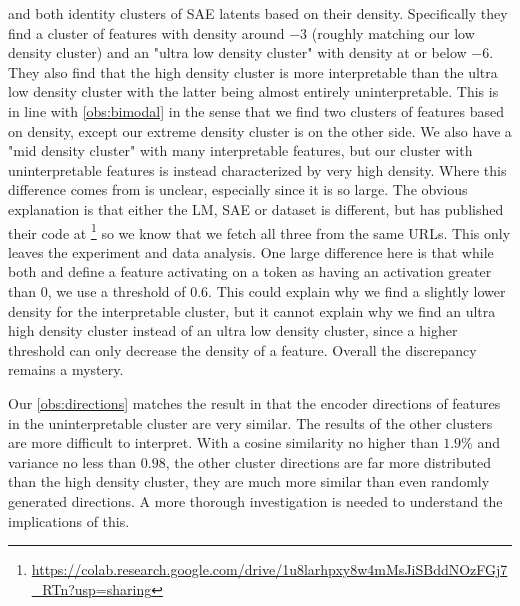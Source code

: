 \textcite{bricken_towards_2023} and \textcite{nanda_open_2023} both identity clusters of SAE latents based on their density.
Specifically they find a cluster of features with density around $-3$ (roughly matching our low density cluster) and an "ultra low density cluster" with density at or below $-6$.
They also find that the high density cluster is more interpretable than the ultra low density cluster with the latter being almost entirely uninterpretable.
This is in line with \ref{obs:bimodal} in the sense that we find two clusters of features based on density, except our extreme density cluster is on the other side.
We also have a "mid density cluster" with many interpretable features, but our cluster with uninterpretable features is instead characterized by very high density.
Where this difference comes from is unclear, especially since it is so large.
The obvious explanation is that either the LM, SAE or dataset is different, but \textcite{nanda_open_2023} has published their code at \footnote{\url{https://colab.research.google.com/drive/1u8larhpxy8w4mMsJiSBddNOzFGj7_RTn?usp=sharing}} so we know that we fetch all three from the same URLs.
This only leaves the experiment and data analysis.
One large difference here is that while both \textcite{bricken_towards_2023} and \textcite{nanda_open_2023} define a feature activating on a token as having an activation greater than $0$, we use a threshold of $0.6$.
This could explain why we find a slightly lower density for the interpretable cluster, but it cannot explain why we find an ultra high density cluster instead of an ultra low density cluster, since a higher threshold can only decrease the density of a feature.
Overall the discrepancy remains a mystery.

Our \ref{obs:directions} matches the result in \textcite{nanda_open_2023} that the encoder directions of features in the uninterpretable cluster are very similar.
The results of the other clusters are more difficult to interpret.
With a cosine similarity no higher than $1.9\%$ and variance no less than $0.98$, the other cluster directions are far more distributed than the high density cluster, they are much more similar than even randomly generated directions.
A more thorough investigation is needed to understand the implications of this.


